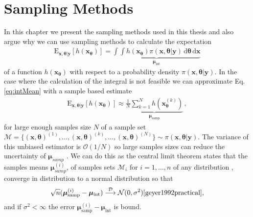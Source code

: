 \section{Sampling Methods}
In this chapter we present the sampling methods used in this thesis and also argue why we can use sampling methods to calculate the expectation
\begin{align}
	\label{eq:intMean}
	\text{E}_{\bm{x},\bm{\theta}|\bm{y}} [h(\bm{x}_{\bm{\theta}})] = \underbrace{ \int \int h(\bm{x}_{\bm{\theta}}) \pi(\bm{x},\bm{\theta}|\bm{y}) \, \text{d} \bm{\theta} \, \text{d} \bm{x} }_{\bm{\mu}_{\text{int}}} 
\end{align}
of a function  $h(\bm{x}_{\bm{\theta}})$ with respect to a probability density $\pi( \bm{x},\bm{\theta}|\bm{y})$.
In the case where the calculation of the integral is not feasible we can approximate Eq. \ref{eq:intMean} with a sample based estimate
\begin{align}
	\label{eq:sampMean}
	\text{E}_{\bm{x},\bm{\theta}|\bm{y}} [h(\bm{x}_{\bm{\theta}})] \approx \underbrace{ \frac{1}{N} \sum_{k=1}^{N} h(\bm{x}^{(k)}_{\bm{\theta}})  }_{\bm{\mu}_{\text{samp}}} \, ,
\end{align}
for large enough samples size $N$ of a sample set $\mathcal{M} = \{  (\bm{x}, \bm{\theta} )^{(1)}, \dots, (\bm{x}, \bm{\theta} )^{(k)} , \dots,  (\bm{x}, \bm{\theta})^{(N)}  \} \sim \pi(\bm{x},\bm{\theta}| \bm{y}) $.
The variance of this unbiased estimator is $\mathcal{O}(1/N)$ so large samples sizes can reduce the uncertainty of $\bm{\mu}_{samp}$ \cite{roberts2004general}.
We can do this as the central limit theorem states that the samples means $ \bm{\mu}^{(i)}_{samp} $, of samples sets $\mathcal{M}_i$ for $i = 1, \dots, n$ of any distribution , converge in distribution to a normal distribution so that
\begin{align}
	 \sqrt{n} (\bm{\mu}^{(i)}_{\text{samp}} -  \bm{\mu}_{\text{int}} ) \overset{\mathcal{D}}{\longrightarrow} \mathcal{N} (0,\sigma^2) \text{\cite{geyer1992practical}},
\end{align}
and if $\sigma^2 < \infty$ the error $\bm{\mu}^{(i)}_{\text{samp}} -  \bm{\mu}_{\text{int}} $ is bound.


